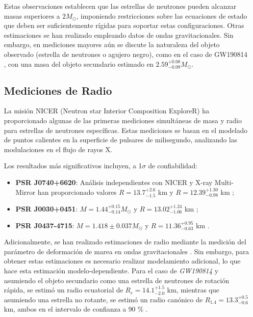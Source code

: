 Estas observaciones establecen que las estrellas de neutrones pueden alcanzar masas superiores a $2 M_\odot$, imponiendo restricciones sobre las ecuaciones de estado que deben ser suficientemente rígidas para soportar estas configuraciones. Otras estimaciones se han realizado empleando datos de ondas gravitacionales. Sin embargo, en mediciones mayores aún se discute la naturaleza del objeto observado (estrella de neutrones o agujero negro), como en el caso de GW190814 \cite{theligoscientificcollaborationGW190814GravitationalWaves2020, lopesNatureMassgapObject2022}, con una masa del objeto secundario estimado en $2.59^{+0.08}_{-0.09} M_\odot$.

\subsection{Mediciones de Radio}

La misión NICER (Neutron star Interior Composition ExploreR) ha proporcionado algunas de las primeras mediciones simultáneas de masa y radio para estrellas de neutrones específicas. Estas mediciones se basan en el modelado de puntos calientes en la superficie de pulsares de milisegundo, analizando las modulaciones en el flujo de rayos X.

Los resultados más significativos incluyen, a 1$\sigma$ de confiabilidad:

\begin{itemize}
	\item \textbf{PSR J0740+6620}: Análisis independientes con NICER y X-ray Multi-Mirror han proporcionado valores $R = 13.7^{+2.6}_{-1.5}$ km \cite{millerRadiusPSRJ0740+66202021} y $R = 12.39^{+1.30}_{-0.98}$ km \cite{rileyNICERViewMassive2021};
	
	\item \textbf{PSR J0030+0451}: $M = 1.44^{+0.15}_{-0.14} M_\odot$ y $R = 13.02^{+1.24}_{-1.06}$ km \cite{millerPSRJ0030+0451Mass2019};
	
	\item \textbf{PSR J0437-4715}: $M = 1.418 \pm 0.037 M_\odot$ y $R = 11.36^{+0.95}_{-0.63}$ km \cite{choudhuryNICERViewNearest2024}.
\end{itemize}

Adicionalmente, se han realizado estimaciones de radio mediante la medición del parámetro de deformación de marea en ondas gravitacionales \cite{kumarTheoreticalExperimentalConstraints2024}. Sin embargo, para obtener estas estimaciones es necesario realizar modelamiento adicional, lo que hace esta estimación modelo-dependiente. Para el caso de \textit{GW190814} y asumiendo el objeto secundario como una estrella de neutrones de rotación rápida, se estimó un radio ecuatorial de $R_e = 14.1^{+1.5}_{-2.0}$ km, mientras que asumiendo una estrella no rotante, se estimó un radio canónico de $R_{1.4} = 13.3^{+0.5}_{-0.6}$ km, ambos en el intervalo de confianza a 90 \% \cite{biswasGW190814PropertiesSecondary2021}.\\


